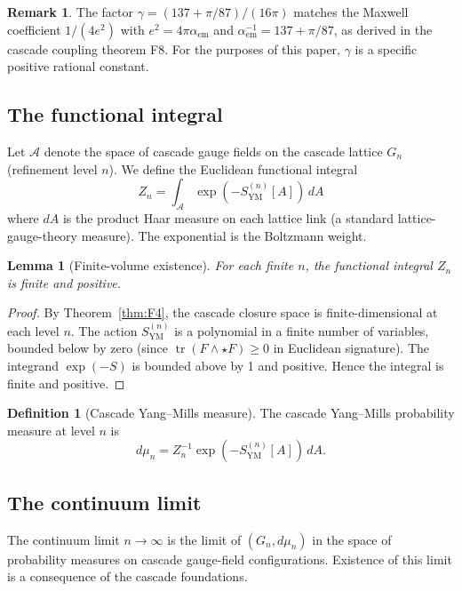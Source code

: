 \documentclass[11pt, a4paper]{amsart}
\newtheorem{lemma}[theorem]{Lemma}
\theoremstyle{definition}
\newtheorem{definition}[theorem]{Definition}
\newtheorem{remark}[theorem]{Remark}
\newcommand{\A}{\mathcal{A}}
\newcommand{\tr}{\operatorname{tr}}
\begin{document}
\begin{remark}
The factor $\gamma = (137 + \pi/87)/(16\pi)$ matches the Maxwell
coefficient $1/(4e^2)$ with $e^2 = 4\pi\alpha_{\mathrm{em}}$ and
$\alpha_{\mathrm{em}}^{-1} = 137 + \pi/87$, as derived in the cascade
coupling theorem F8. For the purposes of this paper, $\gamma$ is a
specific positive rational constant.
\end{remark}

\subsection{The functional integral}

Let $\A$ denote the space of cascade gauge fields on the cascade
lattice $G_n$ (refinement level $n$). We define the Euclidean
functional integral
\begin{equation}
Z_n = \int_\A \exp(-S_{\mathrm{YM}}^{(n)}[A]) \, dA
\end{equation}
where $dA$ is the product Haar measure on each lattice link (a
standard lattice-gauge-theory measure). The exponential is the
Boltzmann weight.

\begin{lemma}[Finite-volume existence]\label{lem:finite}
For each finite $n$, the functional integral $Z_n$ is finite and
positive.
\end{lemma}

\begin{proof}
By Theorem~\ref{thm:F4}, the cascade closure space is finite-dimensional
at each level $n$. The action $S_{\mathrm{YM}}^{(n)}$ is a polynomial in
a finite number of variables, bounded below by zero (since
$\tr(F \wedge \star F) \geq 0$ in Euclidean signature). The integrand
$\exp(-S)$ is bounded above by 1 and positive. Hence the integral is
finite and positive.
\end{proof}

\begin{definition}[Cascade Yang--Mills measure]\label{def:muYM}
The cascade Yang--Mills probability measure at level $n$ is
\[
d\mu_n = Z_n^{-1} \exp(-S_{\mathrm{YM}}^{(n)}[A]) \, dA.
\]
\end{definition}

\subsection{The continuum limit}

The continuum limit $n \to \infty$ is the limit of $(G_n, d\mu_n)$
in the space of probability measures on cascade gauge-field
configurations. Existence of this limit is a consequence of the
cascade foundations.
\end{document}
